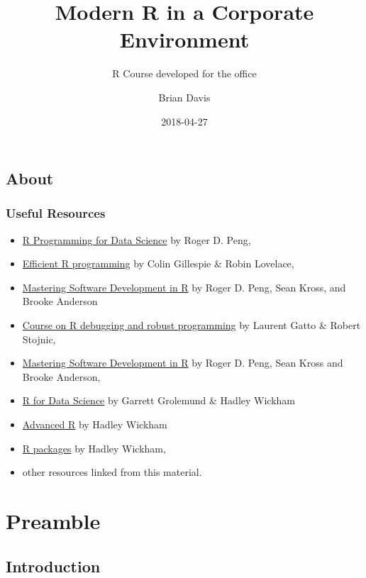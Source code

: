 \documentclass[]{book}
\title{Modern R in a Corporate Environment}
\subtitle{R Course developed for the office}
\author{Brian Davis}
\date{2018-04-27}
\providecommand{\tightlist}{%
  \setlength{\itemsep}{0pt}\setlength{\parskip}{0pt}}
\theoremstyle{definition}
\theoremstyle{definition}
\theoremstyle{definition}
\theoremstyle{remark}
\begin{document}
\maketitle

{
\setcounter{tocdepth}{1}
\tableofcontents
}
\chapter*{About}\label{about}

\section{Useful Resources}\label{useful-resources}

\begin{itemize}
\tightlist
\item
  \href{https://bookdown.org/rdpeng/rprogdatascience/}{R Programming for
  Data Science} by Roger D. Peng,
\item
  \href{https://bookdown.org/csgillespie/efficientR/}{Efficient R
  programming} by Colin Gillespie \& Robin Lovelace,
\item
  \href{https://bookdown.org/rdpeng/RProgDA/}{Mastering Software
  Development in R} by Roger D. Peng, Sean Kross, and Brooke Anderson
\item
  \href{https://github.com/lgatto/2016-02-25-adv-programming-EMBL}{Course
  on R debugging and robust programming} by Laurent Gatto \& Robert
  Stojnic,
\item
  \href{https://bookdown.org/rdpeng/RProgDA/}{Mastering Software
  Development in R} by Roger D. Peng, Sean Kross and Brooke Anderson,
\item
  \href{http://r4ds.had.co.nz/index.html}{R for Data Science} by Garrett
  Grolemund \& Hadley Wickham
\item
  \href{http://adv-r.had.co.nz/}{Advanced R} by Hadley Wickham
\item
  \href{http://r-pkgs.had.co.nz/}{R packages} by Hadley Wickham,
\item
  other resources linked from this material.
\end{itemize}

\part{Preamble}\label{part-preamble}

\chapter{Introduction}\label{preamble-intro}
\end{document}

